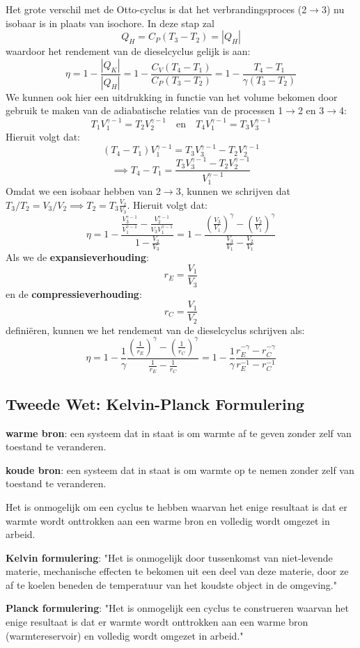 Het grote verschil met de Otto-cyclus is dat het verbrandingsproces (2\(\to\)3) nu isobaar is in plaats van isochore. In deze stap zal 
\[Q_H = C_P(T_3 -T_2) = |Q_H|\]
waardoor het rendement van de dieselcyclus gelijk is aan:
\[\eta = 1 - \frac{|Q_K|}{|Q_H|} = 1 - \frac{C_V(T_4-T_1)}{C_P(T_3 - T_2)} = 1 - \frac{T_4-T_1}{\gamma (T_3 - T_2)}\]
We kunnen ook hier een uitdrukking in functie van het volume bekomen door gebruik te maken van de adiabatische relaties van de processen 1\(\to\)2 en 3\(\to\)4:
\[T_1 V_1^{\gamma - 1} = T_2 V_2^{\gamma - 1} \quad \text{en} \quad T_4 V_1^{\gamma - 1} = T_3 V_3^{\gamma - 1}\]
Hieruit volgt dat:
\[(T_4-T_1)V_1^{\gamma - 1} = T_3V_3^{\gamma - 1}-T_2V_2^{\gamma - 1}\]
\[\implies T_4-T_1 = \frac{T_3V_3^{\gamma - 1}-T_2V_2^{\gamma - 1}}{V_1^{\gamma - 1}}\]
Omdat we een isobaar hebben van 2\(\to\)3, kunnen we schrijven dat \(T_3/T_2 = V_3/V_2 \implies T_2 = T_3 \frac{V_2}{V_3}\). Hieruit volgt dat:
\[\eta = 1 - \frac{\frac{V_3^{\gamma-1}}{V_1^{\gamma-1} }- \frac{V_2^{\gamma-1}}{V_3V_1^{\gamma-1}}}{1 - \frac{V_2}{V_3}} 
= 1 - \frac{\left(\frac{V_3}{V_1}\right)^\gamma-\left(\frac{V_2}{V_1}\right)^{\gamma}}{\frac{V_3}{V_1}- \frac{V_2}{V_1}}\]
Als we de \textbf{expansieverhouding}:
\[r_E = \frac{V_1}{V_3} \]
en de \textbf{compressieverhouding}:
\[r_C = \frac{V_1}{V_2}\]
definiëren, kunnen we het rendement van de dieselcyclus schrijven als:
\[
\eta = 1 - \frac{1}{\gamma} \frac{(\frac{1}{r_E})^{\gamma} - (\frac{1}{r_C})^{\gamma}}{\frac{1}{r_E} - \frac{1}{r_C}} 
= 1 - \frac{1}{\gamma} \frac{r_E^{-\gamma} - r_C^{-\gamma}}{r_E^{-1} - r_C^{-1}}
\]

\subsection{Tweede Wet: Kelvin-Planck Formulering}

\begin{definition}
    \textbf{warme bron}: een systeem dat in staat is om warmte af te geven zonder zelf van toestand te veranderen.
\end{definition}
\begin{definition}
    \textbf{koude bron}: een systeem dat in staat is om warmte op te nemen zonder zelf van toestand te veranderen.
\end{definition}
\begin{postulate}
    Het is onmogelijk om een cyclus te hebben waarvan het enige resultaat is dat er warmte wordt onttrokken aan een warme bron en volledig wordt omgezet in arbeid. 
\end{postulate}
\begin{postulate}
    \textbf{Kelvin formulering}: "Het is onmogelijk door tussenkomst van niet-levende materie, mechanische effecten te bekomen uit een deel van deze materie, door ze af te koelen beneden de temperatuur van het koudste object in de omgeving."
\end{postulate}
\begin{postulate}
    \textbf{Planck formulering}: "Het is onmogelijk een cyclus te construeren waarvan het enige resultaat is dat er warmte wordt onttrokken aan een warme bron (warmtereservoir) en volledig wordt omgezet in arbeid."
\end{postulate}

